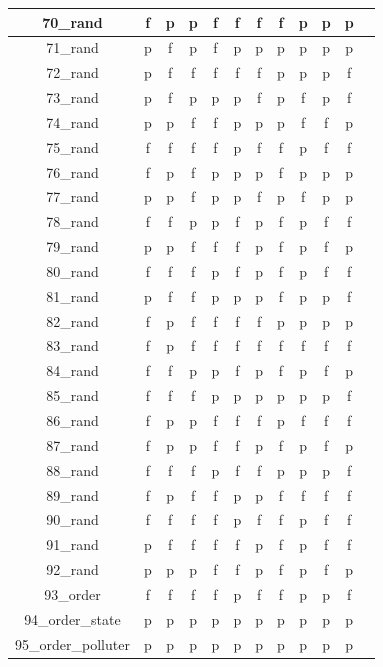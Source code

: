 \documentclass[
fancyheadings, %
%
%
]{stsreprt}
\begin{document}
\begin{longtable}{|c|c|c|c|c|c|c|c|c|c|c|c|}
\hline
70\_rand & f & p & p & f & f & f & f & p & p & p \\
\hline
71\_rand & p & f & p & f & p & p & p & p & p & p \\
\hline
72\_rand & p & f & f & f & f & f & p & p & p & f \\
\hline
73\_rand & p & f & p & p & p & f & p & f & p & f \\
\hline
74\_rand & p & p & f & f & p & p & p & f & f & p \\
\hline
75\_rand & f & f & f & f & p & f & f & p & f & f \\
\hline
76\_rand & f & p & f & p & p & p & f & p & p & p \\
\hline
77\_rand & p & p & f & p & p & f & p & f & p & p \\
\hline
78\_rand & f & f & p & p & f & p & f & p & f & f \\
\hline
79\_rand & p & p & f & f & f & p & f & p & f & p \\
\hline
80\_rand & f & f & f & p & f & p & f & p & f & f \\
\hline
81\_rand & p & f & f & p & p & p & f & p & p & f \\
\hline
82\_rand & f & p & f & f & f & f & p & p & p & p \\
\hline
83\_rand & f & p & f & f & f & f & f & f & f & f \\
\hline
84\_rand & f & f & p & p & f & p & f & p & f & p \\
\hline
85\_rand & f & f & f & p & p & p & p & p & p & f \\
\hline
86\_rand & f & p & p & f & f & f & p & f & f & f \\
\hline
87\_rand & f & p & p & f & f & p & f & p & f & p \\
\hline
88\_rand & f & f & f & p & f & f & p & p & p & f \\
\hline
89\_rand & f & p & f & f & p & p & f & f & f & f \\
\hline
90\_rand & f & f & f & f & p & f & f & p & f & f \\
\hline
91\_rand & p & f & f & f & f & p & f & p & f & f \\
\hline
92\_rand & p & p & p & f & f & p & f & p & f & p \\
\hline
93\_order & f & f & f & f & p & f & f & p & p & f \\
\hline
94\_order\_state & p & p & p & p & p & p & p & p & p & p \\
\hline
95\_order\_polluter & p & p & p & p & p & p & p & p & p & p \\
\hline

\end{longtable}
\end{document}

